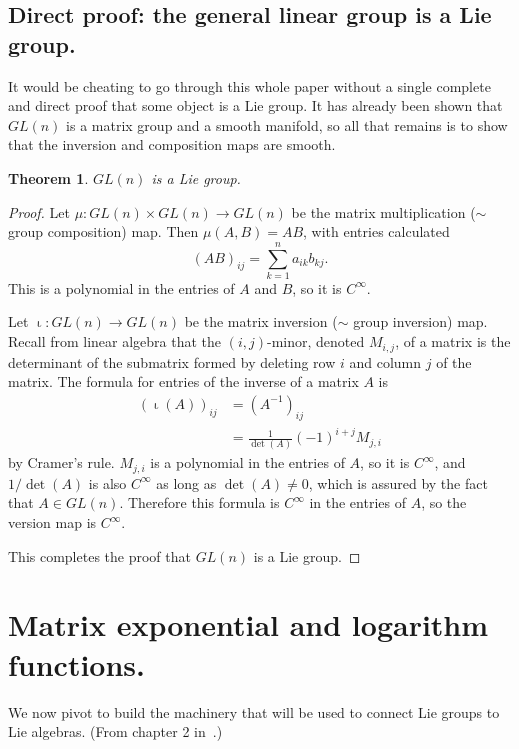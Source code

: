 \documentclass[12pt]{article}
\newtheorem{them}{Theorem}[section]
\theoremstyle{definition}
\theoremstyle{definition}
\theoremstyle{definition}
\theoremstyle{definition}
\theoremstyle{definition}
\theoremstyle{definition}
\theoremstyle{definition}
\theoremstyle{definition}
\begin{document}
\subsection{Direct proof: the general linear group is a Lie group.}
\par{It would be cheating to go through this whole
paper without a single complete and direct proof
that some object is a Lie group. It has already
been shown that $GL(n)$ is a matrix group and a
smooth manifold, so all that remains is to show
that the inversion and composition maps are
smooth.}

\begin{them}$GL(n)$ is a Lie group.\end{them}
\begin{proof}
\par{Let $\mu : GL(n) \times GL(n) \to GL(n)$ be
the matrix multiplication ($\sim$ group composition) map.
Then $\mu(A, B) = AB$, with entries calculated 
\[
    {(AB)}_{ij} = \sum_{k=1}^n a_{ik}b_{kj}.
\] 
This is a polynomial in the entries of $A$ and
$B$, so it is $C^\infty$.}

\par{Let $\upiota: GL(n) \to GL(n)$ be the matrix
inversion ($\sim$ group inversion) map. Recall
from linear algebra that the $(i,j)$-minor,
denoted $M_{i,j}$, of a matrix is the determinant
of the submatrix formed by deleting row $i$ and
column $j$ of the matrix. The formula for entries
of the inverse of a matrix $A$ is 
\[\begin{aligned} {(\upiota(A))}_{ij} & =
{(A^{-1})}_{ij} \\ & =
\frac{1}{\det(A)}{(-1)}^{i+j}M_{j,i}
\end{aligned}\] by Cramer’s rule. $M_{j,i}$ is a
polynomial in the entries of $A$, so it is
$C^\infty$, and $1/ \det(A)$ is also $C^\infty$ as
long as $\det(A) \neq 0$, which is assured by the
fact that $A \in GL(n)$. Therefore this formula is
$C^\infty$ in the entries of $A$, so the version
map is $C^\infty$.
}
\par{This completes the proof that $GL(n)$ is a Lie group.}
\end{proof}

\section{Matrix exponential and logarithm functions.}
\par{We now pivot to build the machinery that will be
used to connect Lie groups to Lie algebras. (From
chapter 2 in~\cite{Hall}.)}
\end{document}
